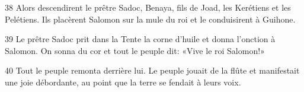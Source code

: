 
38 Alors descendirent le prêtre Sadoc, Benaya, fils de Joad, les Kerétiens et les Pelétiens. Ils placèrent Salomon sur la mule du roi et le conduisirent à Guihone.

39 Le prêtre Sadoc prit dans la Tente la corne d’huile et donna l’onction à Salomon. On sonna du cor et tout le peuple dit: «Vive le roi Salomon!»

40 Tout le peuple remonta derrière lui. Le peuple jouait de la flûte et manifestait une joie débordante, au point que la terre se fendait à leurs voix.